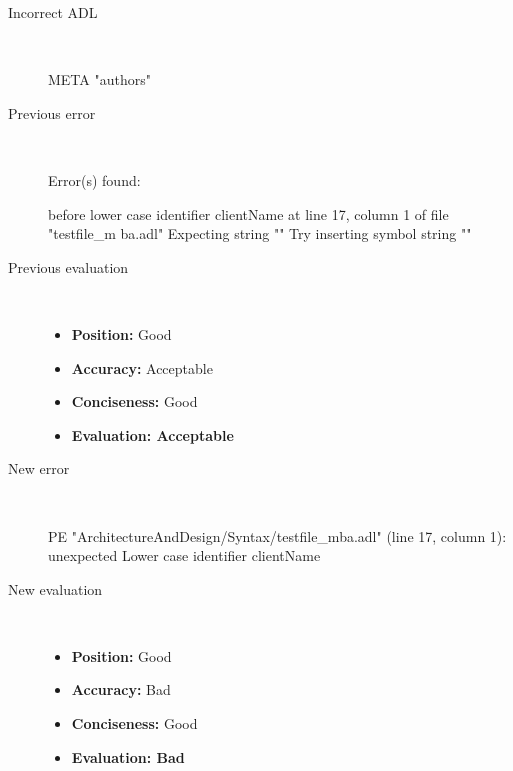 \hrulefill

\begin{description}
  \item[Incorrect ADL]~\\
\begin{adl}
META "authors" \end{adl}
  \item[Previous error]~\\
\begin{haskell}
Error(s) found:

before lower case identifier clientName at line 17, column 1 of file "testfile_m
ba.adl"
Expecting string ""
Try inserting symbol string ""
\end{haskell}
  \item[Previous evaluation]~\\
    \begin{itemize}
    \item \textbf{Position:} Good
    \item \textbf{Accuracy:} Acceptable
    \item \textbf{Conciseness:} Good
    \item \textbf{Evaluation: Acceptable}
    \end{itemize}
  \item[New error]~\\
\begin{haskell}
PE "ArchitectureAndDesign/Syntax/testfile_mba.adl" (line 17, column 1):
unexpected Lower case identifier clientName\end{haskell}
  \item[New evaluation]~\\
    \begin{itemize}
    \item \textbf{Position:} Good
    \item \textbf{Accuracy:} Bad
    \item \textbf{Conciseness:} Good
    \item \textbf{Evaluation: Bad}
    \end{itemize}
  \end{description}

\hrulefill

